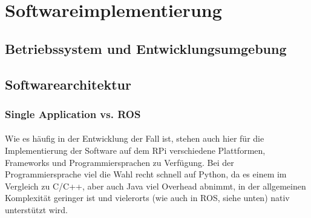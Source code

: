 \section{Softwareimplementierung}
\subsection{Betriebssystem und Entwicklungsumgebung}
\paragraph{}
\subsection{Softwarearchitektur}
\subsubsection{Single Application vs. ROS}
\paragraph{}
Wie es häufig in der Entwicklung der Fall ist, stehen auch hier für die Implementierung
der Software auf dem RPi verschiedene Plattformen, Frameworks und
Programmiersprachen zu Verfügung. Bei der Programmiersprache viel die Wahl recht
schnell auf Python, da es einem im Vergleich zu C/C++, aber auch Java viel Overhead
abnimmt, in der allgemeinen Komplexität geringer ist und vielerorts (wie auch in ROS,
siehe unten) nativ unterstützt wird.

